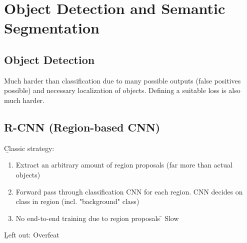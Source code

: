 \section{Object Detection and Semantic Segmentation}
\subsection{Object Detection}
Much harder than classification due to many possible outputs (false positives possible) and necessary localization of objects. Defining a suitable loss is also much harder.

\subsection{R-CNN (Region-based CNN)}
\b{Classic strategy:}
\begin{enumerate}
    \item Extract an arbitrary amount of region proposals (far more than actual objects)
    \item Forward pass through classification CNN for each region. CNN decides on class in region (incl. "background" class)
    \item No end-to-end training due to region proposals \f{\to} Slow
\end{enumerate}
\vspace{0.5em}
\b{Left out: Overfeat\\}

